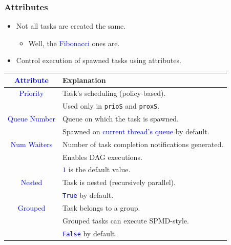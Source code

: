 \documentclass{beamer}
\newcommand{\code}[1]{\lstinline[basicstyle=\sffamily]{#1}}
\newcommand{\tablefont}{\fontsize{8}{13}\selectfont}
\begin{document}
\begin{frame}[fragile]
\frametitle{Attributes}
\begin{itemize}
\item Not all tasks are created the same.
  \begin{itemize}
  \item Well, the \textcolor{blue}{Fibonacci} ones are.
  \end{itemize}
\item Control execution of spawned tasks using attributes.
\end{itemize}
\begin{center}
\tablefont
\begin{tabular}{|c|l|}
\hline
\textcolor{blue}{Attribute} & Explanation \\
\hline
\textcolor{blue}{Priority} & Task's scheduling (policy-based). \\
                           & Used only in \code{prioS} and \code{proxS}. \\
\hline
\textcolor{blue}{Queue Number} & Queue on which the task is spawned. \\
                               & Spawned on \textcolor{blue}{current thread's queue} by default. \\
\hline
\textcolor{blue}{Num Waiters} & Number of task completion notifications generated. \\
                              & Enables DAG executions. \\
                              & \textcolor{blue}{$1$} is the default value. \\
\hline
\textcolor{blue}{Nested} & Task is nested (recursively parallel). \\
                          & \textcolor{blue}{\code{True}} by default. \\
\hline
\textcolor{blue}{Grouped} & Task belongs to a group. \\
                          & Grouped tasks can execute SPMD-style. \\
                          & \textcolor{blue}{\code{False}} by default. \\
\hline
\end{tabular}
\normalsize
\end{center}
\end{frame}
\end{document}
